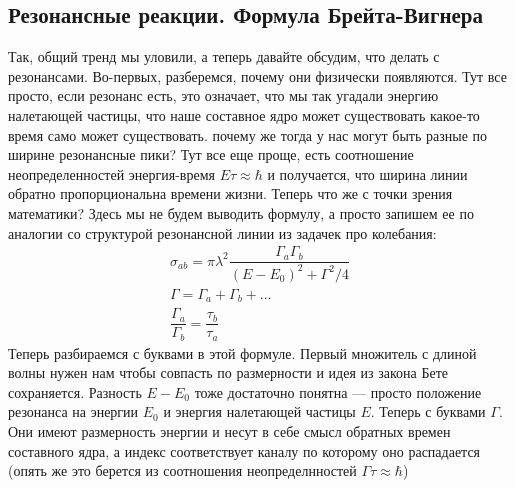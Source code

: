 \documentclass[12pt]{article}
\begin{document}
\subsection{Резонансные реакции. Формула Брейта-Вигнера}
Так, общий тренд мы уловили, а теперь давайте обсудим, что делать с резонансами. Во-первых, разберемся, почему они физически появляются. Тут все просто, если резонанс есть, это означает, что мы так угадали энергию налетающей частицы, что наше составное ядро может существовать какое-то время само может существовать. почему же тогда у нас могут быть разные по ширине резонансные пики? Тут все еще проще, есть соотношение неопределенностей энергия-время $E\tau \approx \hbar$ и получается, что ширина линии обратно пропорциональна времени жизни. Теперь что же с точки зрения математики? Здесь мы не будем выводить формулу, а просто запишем ее по аналогии со структурой резонансной линии из задачек про колебания:
\begin{gather*}
    \sigma_{ab} = \pi \lambda^2 \dfrac{\Gamma_a \Gamma_b}{(E-E_0)^2 + \Gamma^2/4}\\
    \Gamma = \Gamma_a + \Gamma_b + \dots\\
    \dfrac{\Gamma_a}{\Gamma_b}=\dfrac{\tau_b}{\tau_a}
\end{gather*}
Теперь разбираемся с буквами в этой формуле. Первый множитель с длиной волны нужен нам чтобы совпасть по размерности и идея из закона Бете сохраняется. Разность $E-E_0$ тоже достаточно понятна --- просто положение резонанса на энергии $E_0$ и энергия налетающей частицы $E$. Теперь с буквами $\Gamma$. Они имеют размерность энергии и несут в себе смысл обратных времен составного ядра, а индекс соответствует каналу по которому оно распадается (опять же это берется из соотношения неопределнностей $\Gamma \tau \approx \hbar$) 
\end{document}
